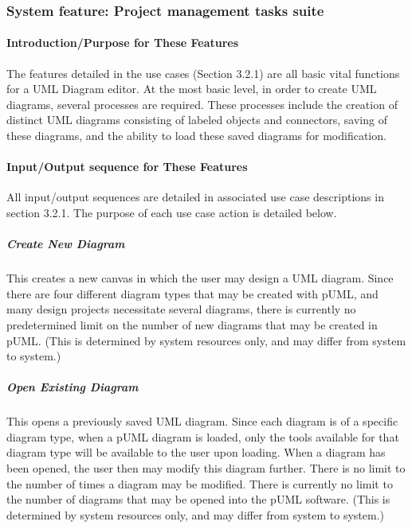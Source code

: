 \documentclass[twoside,letterpaper]{article}
\begin{document}
\clearpage






\subsubsection[System feature: [Project management tasks suite]{\bfseries System feature: Project management tasks suite}

\paragraph[\ Introduction/Purpose for These Features] 
{\bfseries Introduction/Purpose for These Features}
{
The features detailed in the use cases (Section 3.2.1) are all basic vital functions for a UML Diagram editor. At the most basic level, in order to create UML diagrams, several processes are required. These processes include the creation of distinct UML diagrams consisting of labeled objects and connectors, saving of these diagrams, and the ability to load these saved diagrams for modification.
}


\paragraph[Input/Output sequence for this feature]
{\bfseries Input/Output sequence for These Features}
{ All input/output sequences are detailed in associated use case descriptions in section 3.2.1.
 The purpose of each use case action is detailed below. }

\subparagraph{Create New Diagram}
{ This creates a new canvas in which the user may design a UML diagram. Since there are four different diagram types that may be created with pUML, and many design projects necessitate several diagrams, there is currently no predetermined limit on the number of new diagrams that may be created in pUML. (This is determined by system resources only, and may differ from system to system.) }

\subparagraph{Open Existing Diagram}
{ This opens a previously saved UML diagram. Since each diagram is of a specific diagram type, when a pUML diagram is loaded, only the tools available for that diagram type will be available to the user upon loading. When a diagram has been opened, the user then may modify this diagram further. There is no limit to the number of times a diagram may be modified.  There is currently no limit to the number of diagrams that may be opened into the pUML software. (This is determined by system resources only, and may differ from system to system.)  }
\end{document}
